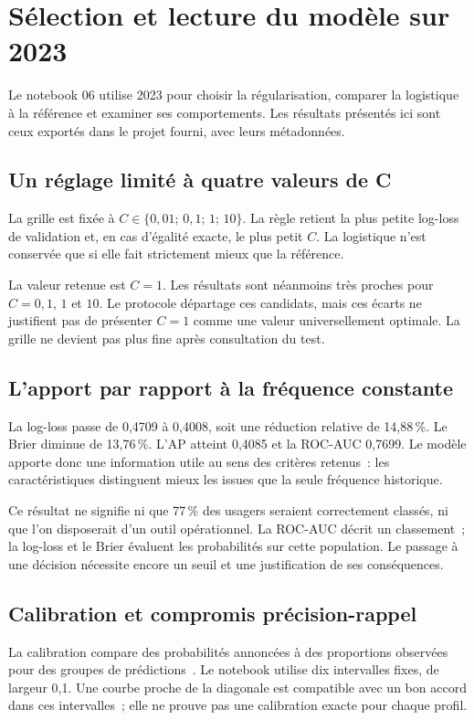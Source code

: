 \chapter{Sélection et lecture du modèle sur 2023}
\label{chap:validation-ml}

Le notebook 06 utilise 2023 pour choisir la régularisation, comparer la logistique à
la référence et examiner ses comportements. Les résultats présentés ici sont ceux
exportés dans le projet fourni, avec leurs métadonnées.

\section{Un réglage limité à quatre valeurs de C}
La grille est fixée à $C\in\{0{,}01;\,0{,}1;\,1;\,10\}$. La règle retient la plus
petite log-loss de validation et, en cas d'égalité exacte, le plus petit $C$.
La logistique n'est conservée que si elle fait strictement mieux que la référence.


La valeur retenue est \textbf{$C=1$}. Les résultats sont néanmoins très proches pour
$C=0{,}1$, $1$ et $10$. Le protocole départage ces candidats, mais ces écarts ne
justifient pas de présenter $C=1$ comme une valeur universellement optimale.
La grille ne devient pas plus fine après consultation du test.

\section{L'apport par rapport à la fréquence constante}

La log-loss passe de 0,4709 à 0,4008, soit une réduction relative de 14,88\,\%.
Le Brier diminue de 13,76\,\%. L'AP atteint 0,4085 et la ROC-AUC 0,7699.
Le modèle apporte donc une information utile au sens des critères retenus~: les
caractéristiques distinguent mieux les issues que la seule fréquence historique.

Ce résultat ne signifie ni que 77\,\% des usagers seraient correctement classés,
ni que l'on disposerait d'un outil opérationnel. La ROC-AUC décrit un classement~;
la log-loss et le Brier évaluent les probabilités sur cette population.
Le passage à une décision nécessite encore un seuil et une justification de ses conséquences.

\section{Calibration et compromis précision-rappel}
La calibration compare des probabilités annoncées à des proportions observées pour
des groupes de prédictions~\cite{sklearn-calibration}. Le notebook utilise dix
intervalles fixes, de largeur 0,1. Une courbe proche de la diagonale est compatible
avec un bon accord dans ces intervalles~; elle ne prouve pas une calibration exacte
pour chaque profil.

